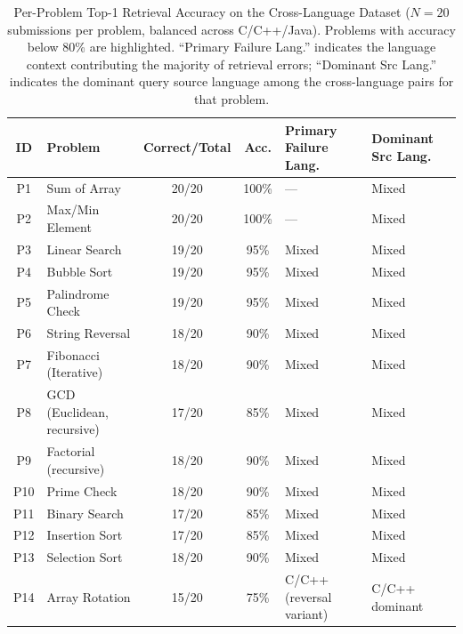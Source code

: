 \begin{table}[!t]
\caption{Per-Problem Top-1 Retrieval Accuracy on the Cross-Language Dataset ($N=20$ submissions per problem, balanced across C/C++/Java). Problems with accuracy below 80\% are highlighted. ``Primary Failure Lang.'' indicates the language context contributing the majority of retrieval errors; ``Dominant Src Lang.'' indicates the dominant query source language among the cross-language pairs for that problem.}
\label{tab:per_problem}
\centering
\begin{tabular}{|c|l|c|c|l|l|}
\hline
\textbf{ID} & \textbf{Problem} & \textbf{Correct/Total} & \textbf{Acc.} & \textbf{Primary Failure Lang.} & \textbf{Dominant Src Lang.} \\
\hline
P1  & Sum of Array                & 20/20 & 100\% & ---                          & Mixed \\
P2  & Max/Min Element             & 20/20 & 100\% & ---                          & Mixed \\
P3  & Linear Search               & 19/20 & 95\%  & Mixed                        & Mixed \\
P4  & Bubble Sort                 & 19/20 & 95\%  & Mixed                        & Mixed \\
P5  & Palindrome Check            & 19/20 & 95\%  & Mixed                        & Mixed \\
P6  & String Reversal             & 18/20 & 90\%  & Mixed                        & Mixed \\
P7  & Fibonacci (Iterative)       & 18/20 & 90\%  & Mixed                        & Mixed \\
P8  & GCD (Euclidean, recursive)  & 17/20 & 85\%  & Mixed                        & Mixed \\
P9  & Factorial (recursive)       & 18/20 & 90\%  & Mixed                        & Mixed \\
P10 & Prime Check                 & 18/20 & 90\%  & Mixed                        & Mixed \\
P11 & Binary Search               & 17/20 & 85\%  & Mixed                        & Mixed \\
P12 & Insertion Sort              & 17/20 & 85\%  & Mixed                        & Mixed \\
P13 & Selection Sort              & 18/20 & 90\%  & Mixed                        & Mixed \\
P14 & Array Rotation              & 15/20 & 75\%  & C/C++ (reversal variant)     & C/C++ dominant \\

\end{tabular}
\end{table}
